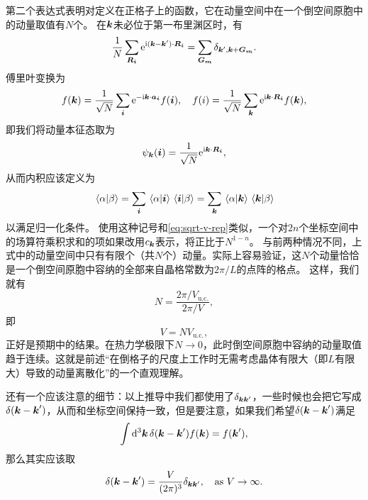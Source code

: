 \begin{enumerate}
\begin{equation}
    \end{equation}
    第二个表达式表明对定义在正格子上的函数，它在动量空间中在一个倒空间原胞中的动量取值有$N$个。
    在$\vb*{k}$未必位于第一布里渊区时，有
    \begin{equation}
        \frac{1}{N} \sum_{\vb*{R}_{\vb*{i}}} \mathrm{e}^{\mathrm{i} (\vb*{k} - \vb*{k}') \cdot \vb*{R}_{\vb*{i}}} = \sum_{\vb*{G}_{\vb*{m}}} \delta_{\vb*{k}', \vb*{k}+\vb*{G}_{\vb*{m}}}.
    \end{equation}
    傅里叶变换为
    \begin{equation}
        f(\vb*{k}) = \frac{1}{\sqrt{N}} \sum_{\vb*{i}} \mathrm{e}^{- \mathrm{i} \vb*{k} \cdot \vb*{a}_{\vb*{i}}} f(\vb*{i}), \quad f(i) = \frac{1}{\sqrt{N}} \sum_{\vb*{k}} \mathrm{e}^{\mathrm{i} \vb*{k} \cdot \vb*{R}_{\vb*{i}}} f(\vb*{k}),
        \label{eq:lattice-fourier}
    \end{equation}
    即我们将动量本征态取为
    \begin{equation}
        \psi_{\vb*{k}}(\vb*{i}) = \frac{1}{\sqrt{N}} \mathrm{e}^{\mathrm{i} \vb*{k} \cdot \vb*{R}_{\vb*{i}}},
    \end{equation}
    从而内积应该定义为
    \begin{equation}
        \braket*{\alpha}{\beta} = \sum_{\vb*{i}} \braket*{\alpha}{\vb*{i}} \braket*{\vb*{i}}{\beta} = \sum_{\vb*{k}} \braket*{\alpha}{\vb*{k}} \braket*{\vb*{k}}{\beta}
        \label{eq:sum-over-lattice}
    \end{equation}
    以满足归一化条件。
    使用这种记号和\eqref{eq:sqrt-v-rep}类似，一个对$2n$个坐标空间中的场算符乘积求和的项如果改用$c_{\vb*{k}}$表示，将正比于$N^{1-n}$。
    与前两种情况不同，上式中的动量空间中只有有限个（共$N$个）动量。实际上容易验证，这$N$个动量恰恰是一个倒空间原胞中容纳的全部来自晶格常数为$2\pi / L$的点阵的格点。
    这样，我们就有
    \[
        N = \frac{2\pi / V_\text{u.c.}}{2\pi / V},
    \]
    即
    \begin{equation}
        V = N V_\text{u.c.},
    \end{equation}
    正好是预期中的结果。在热力学极限下$N \to 0$，此时倒空间原胞中容纳的动量取值趋于连续。这就是前述“在倒格子的尺度上工作时无需考虑晶体有限大（即$L$有限大）导致的动量离散化”的一个直观理解。
\end{enumerate}

还有一个应该注意的细节：以上推导中我们都使用了$\delta_{\vb*{k} \vb*{k}'}$，一些时候也会把它写成$\delta(\vb*{k}- \vb*{k}')$，从而和坐标空间保持一致，但是要注意，如果我们希望$\delta(\vb*{k} - \vb*{k}')$满足
\[
    \int \dd[3]{\vb*{k}} \delta(\vb*{k} - \vb*{k}') f(\vb*{k}) = f(\vb*{k}'),
\]
那么其实应该取
\begin{equation}
    \delta(\vb*{k} - \vb*{k}') = \frac{V}{(2\pi)^3} \delta_{\vb*{k} \vb*{k}'} , \quad \text{as $V \to \infty$}.
\end{equation}

